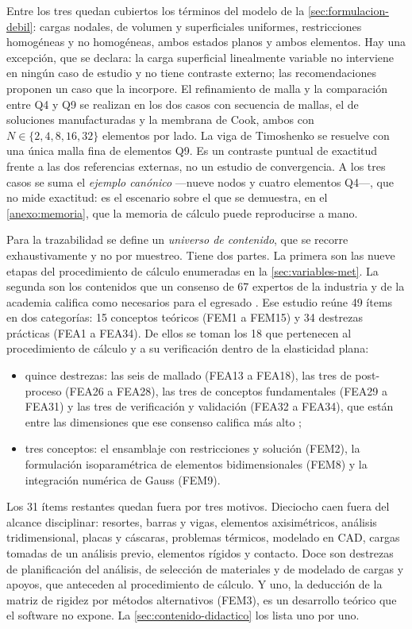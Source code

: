 Entre los tres quedan cubiertos los términos del modelo de la \autoref{sec:formulacion-debil}: cargas nodales, de volumen y superficiales uniformes, restricciones homogéneas y no homogéneas, ambos estados planos y ambos elementos. Hay una excepción, que se declara: la carga superficial linealmente variable no interviene en ningún caso de estudio y no tiene contraste externo; las recomendaciones proponen un caso que la incorpore. El refinamiento de malla y la comparación entre Q4 y Q9 se realizan en los dos casos con secuencia de mallas, el de soluciones manufacturadas y la membrana de Cook, ambos con $N\in\{2,4,8,16,32\}$ elementos por lado. La viga de Timoshenko se resuelve con una única malla fina de elementos Q9. Es un contraste puntual de exactitud frente a las dos referencias externas, no un estudio de convergencia. A los tres casos se suma el \emph{ejemplo canónico} —nueve nodos y cuatro elementos Q4—, que no mide exactitud: es el escenario sobre el que se demuestra, en el \autoref{anexo:memoria}, que la memoria de cálculo puede reproducirse a mano.

Para la trazabilidad se define un \emph{universo de contenido}, que se recorre exhaustivamente y no por muestreo. Tiene dos partes. La primera son las nueve etapas del procedimiento de cálculo enumeradas en la \autoref{sec:variables-met}. La segunda son los contenidos que un consenso de 67 expertos de la industria y de la academia califica como necesarios para el egresado \autocite[pp.~1162-1163]{perezsantiago2023fem}. Ese estudio reúne 49 ítems en dos categorías: 15 conceptos teóricos (FEM1 a FEM15) y 34 destrezas prácticas (FEA1 a FEA34). De ellos se toman los 18 que pertenecen al procedimiento de cálculo y a su verificación dentro de la elasticidad plana:
\begin{itemize}
    \item quince destrezas: las seis de mallado (FEA13 a FEA18), las tres de post-proceso (FEA26 a FEA28), las tres de conceptos fundamentales (FEA29 a FEA31) y las tres de verificación y validación (FEA32 a FEA34), que están entre las dimensiones que ese consenso califica más alto \autocite[p.~1168]{perezsantiago2023fem};
    \item tres conceptos: el ensamblaje con restricciones y solución (FEM2), la formulación isoparamétrica de elementos bidimensionales (FEM8) y la integración numérica de Gauss (FEM9).
\end{itemize}
Los 31 ítems restantes quedan fuera por tres motivos. Dieciocho caen fuera del alcance disciplinar: resortes, barras y vigas, elementos axisimétricos, análisis tridimensional, placas y cáscaras, problemas térmicos, modelado en CAD, cargas tomadas de un análisis previo, elementos rígidos y contacto. Doce son destrezas de planificación del análisis, de selección de materiales y de modelado de cargas y apoyos, que anteceden al procedimiento de cálculo. Y uno, la deducción de la matriz de rigidez por métodos alternativos (FEM3), es un desarrollo teórico que el software no expone. La \autoref{sec:contenido-didactico} los lista uno por uno.

